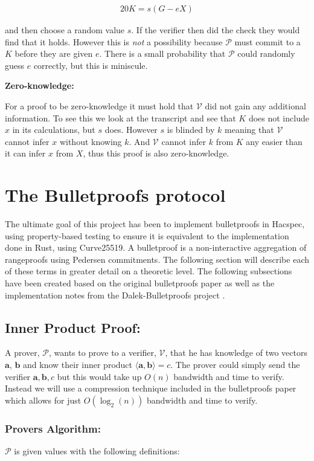 \documentclass{article}
\newcommand{\eq}[1]{\begin{alignat*}{20}#1\end{alignat*}}
\renewcommand{\vec}[1]{\boldsymbol{#1}}
\newcommand{\V}{\mathcal{V}}
\renewcommand{\P}{\mathcal{P}}
\newcommand{\dotp}[2]{\langle #1, #2 \rangle}
\begin{document}
\eq{
	K = s(G - eX)
}

and then choose a random value $s$. If the verifier then did the check
they would find that it holds. However this is \textit{not} a possibility
because $\P$ must commit to a $K$ before they are given $e$. There
is a small probability that $\P$ could randomly guess $e$ correctly,
but this is miniscule.

\textbf{Zero-knowledge:}

For a proof to be zero-knowledge it must hold that $\V$ did not gain
any additional information. To see this we look at the transcript
and see that $K$ does not include $x$ in its calculations, but $s$
does. However $s$ is blinded by $k$ meaning that $\V$ cannot infer $x$
without knowing $k$. And $\V$ cannot infer $k$ from $K$ any easier
than it can infer $x$ from $X$, thus this proof is also zero-knowledge.

\section{The Bulletproofs protocol} \label{Bulletproofs}

The ultimate goal of this project has been to implement bulletproofs
in Hacspec, using property-based testing to ensure it is equivalent to
the implementation done in Rust, using Curve25519. A bulletproof is a
non-interactive aggregation of rangeproofs using Pedersen commitments.
The following section will describe each of these terms in greater
detail on a theoretic level. The following subsections have been
created based on the original bulletproofs paper \cite{bulletproofs}
as well as the implementation notes from the Dalek-Bulletproofs project
\cite{dalek}.

\subsection{Inner Product Proof:}
A prover, $\P$, wants to prove to a verifier, $\V$, that he has
knowledge of two vectors $\vec{a}$, $\vec{b}$ and know their inner
product $\dotp{\vec{a}}{\vec{b}} = c$. The prover could simply send
the verifier $\vec{a}, \vec{b}, c$ but this would take up $O(n)$
bandwidth and time to verify. Instead we will use a compression
technique included in the bulletproofs paper which allows for just
$O(\log_2(n))$ bandwidth and time to verify.

\subsubsection{Provers Algorithm:}
$\P$ is given values with the following definitions:
\end{document}
